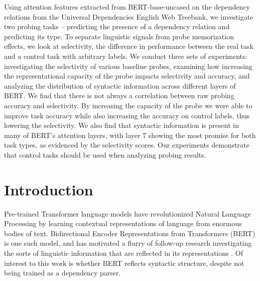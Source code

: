 \documentclass[12pt,a4paper]{article}
\begin{document}
Using attention features extracted from BERT-base-uncased on the dependency relations from the Universal Dependencies English Web Treebank, we investigate two probing tasks -- predicting the presence of a dependency relation and predicting its type. To separate linguistic signals from probe memorization effects, we look at selectivity, the difference in performance between the real task and a control task with arbitrary labels. We conduct three sets of experiments: investigating the selectivity of various baseline probes, examining how increasing the representational capacity of the probe impacts selectivity and accuracy, and analyzing the distribution of syntactic information across different layers of BERT. We find that there is not always a correlation between raw probing accuracy and selectivity. By increasing the capacity of the probe we were able to improve task accuracy while also increasing the accuracy on control labels, thus lowering the selectivity. We also find that syntactic information is present in many of BERT's attention layers, with layer 7 showing the most promise for both task types, as evidenced by the selectivity scores. Our experiments demonstrate that control tasks should be used when analyzing probing results.

\newpage


\thispagestyle{empty}
\tableofcontents
\newpage

\setcounter{page}{1}

\section{Introduction}

Pre-trained Transformer language models have revolutionized Natural Language Processing by learning contextual representations of language from enormous bodies of text. Bidirectional Encoder Representations from Transformers (BERT) is one such model, and has motivated a flurry of follow-up research investigating the sorts of linguistic information that are reflected in its representations \cite{devlin2019bert}. Of interest to this work is whether BERT reflects syntactic structure, despite not being trained as a dependency parser.
\end{document}
